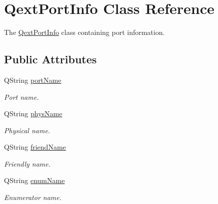 \hypertarget{structQextPortInfo}{}\section{Qext\+Port\+Info Class Reference}
\label{structQextPortInfo}


The \hyperlink{structQextPortInfo}{Qext\+Port\+Info} class containing port information.  


\subsection*{Public Attributes}
\begin{DoxyCompactItemize}
\item 
\mbox{\label{structQextPortInfo_ab28ecc59f84babdf486ab5fad74e024a}} 
Q\+String \hyperlink{structQextPortInfo_ab28ecc59f84babdf486ab5fad74e024a}{port\+Name}
\begin{DoxyCompactList}\small\item\em Port name. \end{DoxyCompactList}\item 
\mbox{\label{structQextPortInfo_a9bb0593dbd5bc1a0fc081e61268eaf46}} 
Q\+String \hyperlink{structQextPortInfo_a9bb0593dbd5bc1a0fc081e61268eaf46}{phys\+Name}
\begin{DoxyCompactList}\small\item\em Physical name. \end{DoxyCompactList}\item 
\mbox{\label{structQextPortInfo_a1bf41f0d6c577f87161f4fdb077fb952}} 
Q\+String \hyperlink{structQextPortInfo_a1bf41f0d6c577f87161f4fdb077fb952}{friend\+Name}
\begin{DoxyCompactList}\small\item\em Friendly name. \end{DoxyCompactList}\item 
\mbox{\label{structQextPortInfo_a47a6287c969ce9797b87f9ffdf36763c}} 
Q\+String \hyperlink{structQextPortInfo_a47a6287c969ce9797b87f9ffdf36763c}{enum\+Name}
\begin{DoxyCompactList}\small\item\em Enumerator name. \end{DoxyCompactList}\item 

\end{DoxyCompactItemize}
